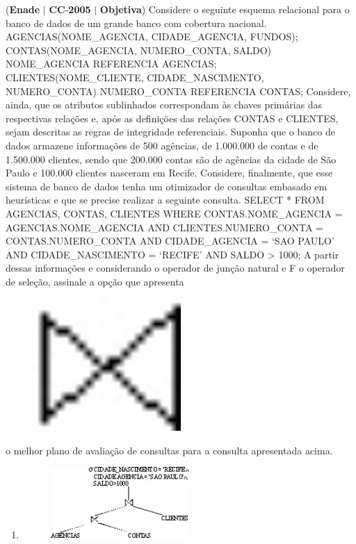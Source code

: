 \documentclass{exam}
\begin{document}
\begin{questions}
\question (\textbf{Enade} $|$ \textbf{CC}-\textbf{2005} $|$ \textbf{Objetiva})
Considere o seguinte esquema relacional para o banco de dados de um grande banco com cobertura nacional.
AGENCIAS(NOME\_AGENCIA, CIDADE\_AGENCIA, FUNDOS);
CONTAS(NOME\_AGENCIA, NUMERO\_CONTA, SALDO) NOME\_AGENCIA REFERENCIA AGENCIAS;
CLIENTES(NOME\_CLIENTE, CIDADE\_NASCIMENTO, NUMERO\_CONTA) NUMERO\_CONTA REFERENCIA CONTAS;
Considere, ainda, que os atributos sublinhados correspondam às chaves primárias das respectivas relações e, após as definições das
relações CONTAS e CLIENTES, sejam descritas as regras de integridade referenciais. Suponha que o banco de dados armazene
informações de 500 agências, de 1.000.000 de contas e de 1.500.000 clientes, sendo que 200.000 contas são de agências da cidade
de São Paulo e 100.000 clientes nasceram em Recife. Considere, finalmente, que esse sistema de banco de dados tenha um otimizador
de consultas embasado em heurísticas e que se precise realizar a seguinte consulta.
SELECT *
FROM AGENCIAS, CONTAS, CLIENTES
WHERE CONTAS.NOME\_AGENCIA = AGENCIAS.NOME\_AGENCIA
AND CLIENTES.NUMERO\_CONTA = CONTAS.NUMERO\_CONTA
AND CIDADE\_AGENCIA = ‘SAO PAULO’
AND CIDADE\_NASCIMENTO = ‘RECIFE’
AND SALDO > 1000;
A partir dessas informações e considerando  o operador de junção natural e F o operador de seleção, assinale a opção que apresenta
\begin{figure}[H]
	\begin{center}
		\includegraphics[width=0.5\textwidth]{CIENCIA_DA_COMPUTACAO_Prova2005-utf8_figuras/fig-0021.jpg}
	\end{center}
\end{figure}
o melhor plano de avaliação de consultas para a consulta apresentada acima.
	\begin{enumerate}[label=\alph*)]
		\item  
\begin{figure}[H]
	\begin{center}
		\includegraphics[width=0.5\textwidth]{CIENCIA_DA_COMPUTACAO_Prova2005-utf8_figuras/fig-0022.jpg}

\end{center}
\end{figure}
\end{enumerate}
\end{questions}
\end{document}
